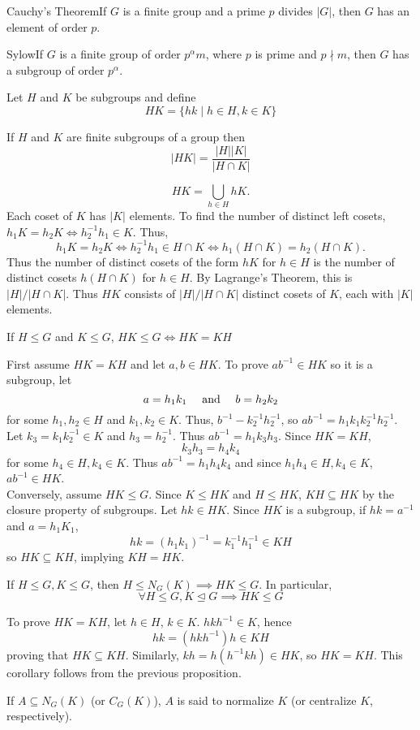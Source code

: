 \documentclass{report}
\newcommand{\thm}[2]{\begin{Theorem}{#1}{}#2\end{Theorem}}
\newcommand{\cor}[2]{\begin{Corollary}{#1}{}#2\end{Corollary}}
\newcommand{\mprop}[2]{\begin{Prop}{#1}{}#2\end{Prop}}
\newcommand{\dfn}[2]{\begin{Definition}[colbacktitle=red!75!black]{#1}{}#2\end{Definition}}
\newenvironment{myproof}[1][\proofname]{%
	\proof[\bfseries #1: ]%
}{\endproof}
\begin{document}
\thm{Cauchy's Theorem}{If $G$ is a finite group and a prime $p$ divides $|G|$, then $G$ has an element of order $p$.}
\thm{Sylow}{If $G$ is a finite group of order $p^\alpha m$, where $p$ is prime and $p \nmid m$, then $G$ has a subgroup of order $p^\alpha$.}
\dfn{}{Let $H$ and $K$ be subgroups and define 
$$HK = \{hk \mid h \in H, k \in K \}$$}
\mprop{}{If $H$ and $K$ are finite subgroups of a group then 
$$|HK| = \frac{|H||K|}{|H \cap K|}$$}
\begin{myproof}
    $$HK = \bigcup_{h \in H} hK.$$
    Each coset of $K$ has $|K|$ elements. To find the number of distinct left cosets, $h_1 K = h_2 K \iff h_2 ^{-1} h_1 \in K$. Thus, 
    $$h_1 K = h_2 K \iff h_2 ^{-1}h_1 \in H \cap K \iff h_1 ( H \cap K) = h_2 (H \cap K).$$
    Thus the number of distinct cosets of the form $hK$ for $h \in H$ is the number of distinct cosets $h(H \cap K)$ for $h \in H$. By Lagrange's Theorem, this is $|H|/|H\cap K |$. Thus $HK$ consists of $|H|/|H\cap K|$ distinct cosets of $K$, each with $|K|$ elements. 
\end{myproof}
\mprop{}{If $H \leq G$ and $K \leq G$, $HK\leq G \iff HK = KH$}
\begin{myproof}
    First assume $HK = KH$ and let $a,b \in HK$. To prove $ab^{-1} \in HK$ so it is a subgroup, let 
    $$a = h_1 k_1 \text{\hspace{10pt} and \hspace{10pt}} b = h_2 k_2$$
    for some $h_1 ,h_2 \in H$ and $k_1 , k_2 \in K$. Thus, $b^{-1} - k_2 ^{-1} h_2 ^{-1}$, so $ab^{-1} = h_1 k_1 k_2^{-1}h_2^{-1}$. Let $k_3 = k_1 k_2 ^{-1} \in K$ and $h_3 = h_2 ^{-1}$. Thus $ab^{-1}=h_1 k_3 h_3$. Since $HK = KH$, 
    $$k_3 h_3 = h_4 k_4$$
    for some $h_4 \in H, k_4 \in K$. Thus $ab^{-1} = h_1 h_4 k_4$ and since $h_1 h_4 \in H, k_4 \in K$, $ab^{-1} \in HK$. \\
    Conversely, assume $HK \leq G$. Since $K \leq HK$ and $H \leq HK$, $KH \subseteq HK$ by the closure property of subgroups. Let $hk \in HK$. Since $HK$ is a subgroup, if $hk = a^{-1}$ and $a = h_1 K_1$,
    $$hk = (h_1 k_1)^{-1} = k_1 ^{-1} h_1^{-1} \in KH$$
    so $HK \subseteq KH$, implying $KH = HK$. 
\end{myproof}
\cor{}{If $H \leq G, K \leq G$, then $H \leq N_G (K) \implies HK \leq G$. In particular,
$$\forall H \leq G, K \unlhd G \implies HK \leq G$$}
\begin{myproof}
    To prove $HK = KH$, let $h \in H$, $k \in K$. $hkh^{-1} \in K$, hence 
    $$hk = (hkh^{-1}) h \in KH$$
    proving that $HK \subseteq KH$. Similarly, $kh = h(h^{-1} kh) \in HK$, so $HK = KH$. This corollary follows from the previous proposition. 
\end{myproof}
\dfn{}{If $A \subseteq N_G (K)$ (or $C_G (K)$), $A$ is said to normalize $K$ (or centralize $K$, respectively).}
\end{document}
